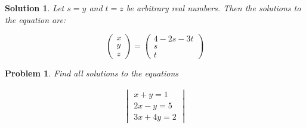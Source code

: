 \documentclass{article}
\newtheorem{problem}{Problem}
\newtheorem*{solution}{Solution}
\begin{document}
\begin{solution}
Let $s = y$ and $t = z$ be arbitrary real numbers. Then the solutions to the equation are:

\begin{equation*}
\begin{pmatrix}
x \\ y \\ z 
\end{pmatrix} 
= 
\begin{pmatrix}
4 - 2s - 3t \\
s \\
t
\end{pmatrix}
\end{equation*}

\end{solution}

\begin{problem}
Find all solutions to the equations

\begin{align*}
\begin{vmatrix}
x + y = 1 \\
2x - y = 5 \\
3x + 4y = 2
\end{vmatrix}
\end{align*}
\end{problem}
\end{document}
